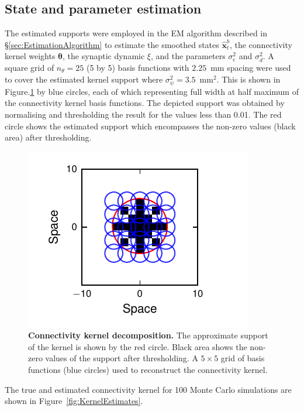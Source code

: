 \documentclass[]{article}
\begin{document}
\subsection{State and parameter estimation}
The estimated supports were employed in the EM algorithm described in \S\ref{sec:EstimationAlgorithm} to estimate the smoothed states $\hat{\mathbf x}_t^b$, the connectivity kernel weights $\boldsymbol\theta$, the synaptic dynamic $\xi$, and the parameters $\sigma_{\epsilon}^2$ and $\sigma^2_d$. A  square grid of $n_{\theta}=25$ (5 by 5) basis functions with $2.25$~mm spacing were used to cover the estimated kernel support where $\sigma_{\psi}^2=3.5$~mm$^2$. This is shown in Figure.\ref{fig:KernelWidthEstimation} by blue circles, each of which representing full width at half maximum of the connectivity kernel basis functions. The depicted support was obtained by normalising and thresholding the result for the  values less than 0.01.  The red circle shows the estimated support which encompasses the non-zero values (black area) after thresholding. 
\begin{figure}[!ht]
\begin{center}
\includegraphics{./Figures/KernelBasis1.pdf}
\end{center}
\caption{{\bf Connectivity kernel decomposition.} The approximate support of the kernel is shown by the red circle. Black area shows the non-zero values of the support after thresholding. A $5\times5$ grid of basis functions (blue circles) used to reconstruct the connectivity kernel.}
\label{fig:KernelWidthEstimation}
\end{figure}
 The true and estimated connectivity kernel for 100 Monte Carlo simulations are shown in Figure~\ref{fig:KernelEstimates}. 
\end{document}

